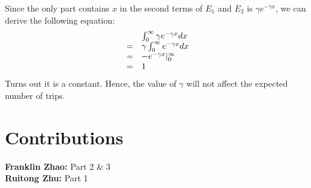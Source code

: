 \documentclass[11pt]{article}
\begin{document}
Since the only part contains $x$ in the second terms of $E_1$ and $E_2$ is $\gamma e^{-\gamma x}$, we can derive the following equation:
\begin{equation}
\begin{array}{ll}
&\int_{0}^{\infty}\gamma e^{-\gamma x}dx\\
=&\gamma\int_{0}^{\infty}e^{-\gamma x}dx\\
=&-e^{-\gamma x}\Huge{|}_0^{\infty}\\
=&1
\end{array}
\end{equation}
Turns out it is a constant. Hence, the value of $\gamma$ will not affect the expected number of trips.
\section*{Contributions}
\textbf{Franklin Zhao:} Part 2 \& 3\\
\textbf{Ruitong Zhu:} Part 1
\end{document}
